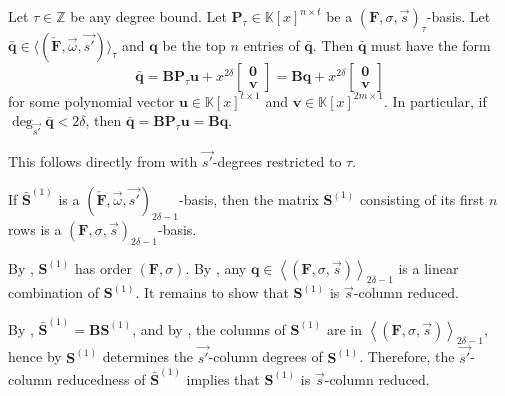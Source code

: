 \begin{cor}
\label{cor:FtauBasisForm}Let $\tau\in\mathbb{Z}$ be any degree bound.
Let $\mathbf{P}_{\tau}\in\mathbb{K}\left[x\right]^{n\times t}$ be
a $\left(\mathbf{F},\sigma,\vec{s}\right)_{\tau}$-basis. Let $\bar{\mathbf{q}}\in\langle(\check{\mathbf{F}},\vec{\omega},\vec{s'})\rangle_{\tau}$
and $\mathbf{q}$ be the top $n$ entries of $\bar{\mathbf{q}}$.
Then $\bar{\mathbf{q}}$ must have the form \[
\bar{\mathbf{q}}=\mathbf{B}\mathbf{P}_{\tau}\mathbf{u}+x^{2\delta}\begin{bmatrix}\mathbf{0}\\
\mathbf{v}\end{bmatrix}=\mathbf{B}\mathbf{q}+x^{2\delta}\begin{bmatrix}\mathbf{0}\\
\mathbf{v}\end{bmatrix}\]
 for some polynomial vector $\mathbf{u}\in\mathbb{K}\left[x\right]^{t\times1}$
and $\mathbf{v}\in\mathbb{K}\left[x\right]^{2m\times1}$. In particular,
if $\deg_{\vec{s'}}\bar{\mathbf{q}}<2\delta$, then $\bar{\mathbf{q}}=\mathbf{B}\mathbf{P}_{\tau}\mathbf{u}=\mathbf{B}\mathbf{q}$. \end{cor}
\begin{pf}
This follows directly from  with $\vec{s'}$-degrees
restricted to $\tau$.\end{pf}
\begin{lem}
\label{lem:2delta-1Basis}If $\bar{\mathbf{S}}^{\left(1\right)}$
is a $(\check{\mathbf{F}},\vec{\omega},\vec{s'})_{2\delta-1}$-basis,
then the matrix $\mathbf{S}^{\left(1\right)}$ consisting of its first
$n$ rows is a $\left(\mathbf{F},\sigma,\vec{s}\right)_{2\delta-1}$-basis.\end{lem}
\begin{pf}
By , $\mathbf{S}^{\left(1\right)}$ has
order $\left(\mathbf{F},\sigma\right)$. By ,
any $\mathbf{q}\in\left\langle \left(\mathbf{F},\sigma,\vec{s}\right)\right\rangle _{2\delta-1}$
is a linear combination of $\mathbf{S}^{\left(1\right)}$. It remains
to show that $\mathbf{S}^{\left(1\right)}$ is $\vec{s}$-column reduced. 

By , $\bar{\mathbf{S}}^{\left(1\right)}=\mathbf{B}\mathbf{S}^{\left(1\right)}$,
and by , the columns of $\mathbf{S}^{\left(1\right)}$
are in $\left\langle \left(\mathbf{F},\sigma,\vec{s}\right)\right\rangle _{2\delta-1}$,
hence by  $\mathbf{S}^{\left(1\right)}$
determines the $\vec{s'}$-column degrees of $\mathbf{S}^{\left(1\right)}$.
Therefore, the $\vec{s'}$-column reducedness of $\bar{\mathbf{S}}^{\left(1\right)}$
implies that $\mathbf{S}^{\left(1\right)}$ is $\vec{s}$-column reduced.\end{pf}
